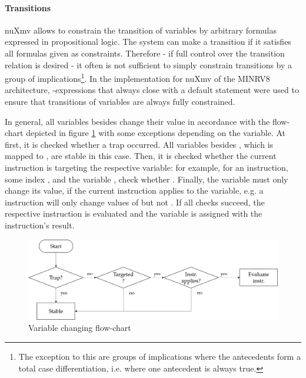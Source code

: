 \paragraph{Transitions}
nuXmv allows to constrain the transition of variables by arbitrary formulas expressed in propositional logic.
The system can make a transition if it satisfies all formulas given as constraints.
Therefore - if full control over the transition relation is desired - it often is not sufficient to simply constrain transitions by a group of implications\footnote{%
    The exception to this are groups of implications where the antecedents form a total case differentiation, i.e. where one antecedent is always true.
}.
In the implementation for nuXmv of the MINRV8 architecture, -expressions that always close with a default statement were used to ensure that transitions of variables are always fully constrained.

In general, all variables besides  change their value in accordance with the flow-chart depicted in figure \ref{fig:implementation-flow} with some exceptions depending on the variable.
At first, it is checked whether a trap occurred.
All variables besides , which is mapped to , are stable in this case.
Then, it is checked whether the current instruction is targeting the respective variable: for example, for an  instruction, some index , and the variable , check whether .
Finally, the variable must only change its value, if the current instruction applies to the variable, e.g. a  instruction will only change values of  but not .
If all checks succeed, the respective instruction is evaluated and the variable is assigned with the instruction's result.

\begin{figure}
    \centering
    \includegraphics[width=\textwidth]{figures/implementation-flow.png}
    \caption{Variable changing flow-chart}
    \label{fig:implementation-flow}
\end{figure}

